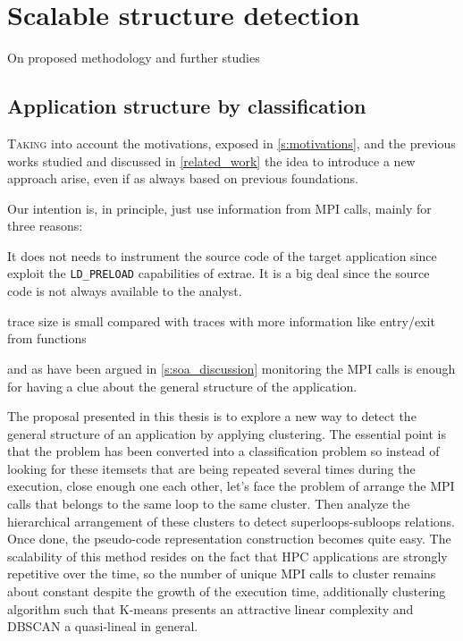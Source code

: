 
\chapter{Scalable structure detection}

On proposed methodology and further studies

\section{Application structure by
classification}\label{s:app_structire_by_classification}

\lettrine{T}{aking} into account the motivations, exposed in \ref{s:motivations}, and the
previous works studied and discussed in \ref{related_work} the idea to introduce
a new approach arise, even if as always based on previous foundations.  
 
Our intention is, in principle, just use information from MPI calls, mainly for 
three reasons:
\begin{enumerate*}[label=\roman*)]
  \item It does not needs to instrument the source code of the target
    application since exploit the \texttt{LD\_PRELOAD} capabilities of extrae.
    It is a big deal since the source code is not always available to the
    analyst.
  \item trace size is small compared with traces with more information
    like entry/exit from functions
  \item and as have been argued in \ref{s:soa_discussion} monitoring the MPI 
    calls is enough for having a clue about the general structure of the 
    application.
\end{enumerate*}

The proposal presented in this thesis is to explore a new way to detect the
 general structure of an application by applying clustering. 
The essential point is that the problem has been converted into a classification 
problem so instead of looking for these itemsets that are being
repeated several times during the execution, close enough one each other, let's
face the problem of arrange the MPI calls that belongs to the same loop to the
same cluster. Then analyze the hierarchical arrangement of these clusters to
detect superloops-subloops relations. Once done, the pseudo-code representation 
construction becomes quite easy. The scalability of this method resides on the 
fact that
HPC applications are strongly repetitive over the time, so the number of unique
MPI calls to cluster remains about constant despite the growth of the execution
time, additionally clustering algorithm such that K-means presents an attractive 
linear complexity and DBSCAN a quasi-lineal in general.

